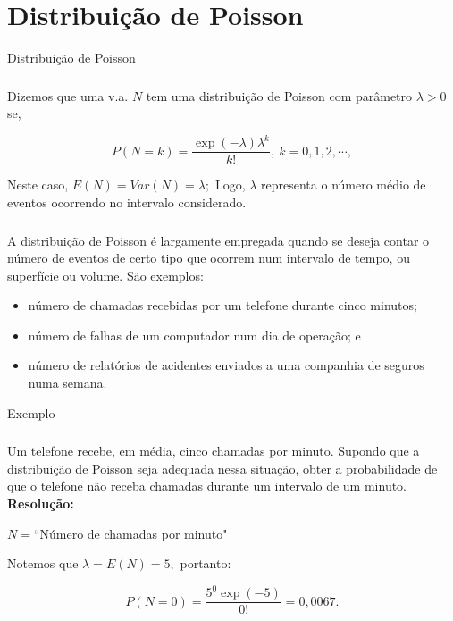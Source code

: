 \documentclass[14pt,aspectratio=1610]{beamer}
\begin{document}
\section{Distribuição de Poisson}
\begin{frame}{Distribuição de Poisson}
\frametitle{}
\begin{block}{}
\justifying
Dizemos que uma v.a. $N$ tem uma distribuição de Poisson com parâmetro
$\lambda > 0$ se,

$$P(N=k)=\dfrac{\exp{(-\lambda)}\lambda^{k}}{k!},\ k=0,1,2,\cdots,$$

Neste caso, $E(N)=Var(N)=\lambda;$ Logo, $\lambda$ representa o número médio de eventos ocorrendo no intervalo considerado.

\end{block}
\end{frame}

\begin{frame}{}
\frametitle{}
\begin{block}{}
\justifying
A distribuição de Poisson é largamente empregada quando se deseja contar o número
de eventos de certo tipo que ocorrem num intervalo de tempo, ou superfície ou 
volume. São exemplos:
\begin{itemize}
\item número de chamadas recebidas por um telefone durante cinco minutos;
\item número de falhas de um computador num dia de operação; e
\item número de relatórios de acidentes enviados a uma companhia de seguros numa
semana.
\end{itemize}
\end{block}
\end{frame}

\begin{frame}{Exemplo}
\frametitle{}
\begin{block}{}
\justifying
Um telefone recebe, em média, cinco chamadas por minuto. Supondo que a distribuição de Poisson seja adequada nessa situação, obter a probabilidade de que o telefone não receba chamadas durante um intervalo de um minuto.
\pause
{\bf Resolução:}

$N=$``Número de chamadas por minuto"

Notemos que $\lambda=E(N)=5,$ portanto:

$$P(N=0)=\dfrac{5^{0}\exp{(-5)}}{0!}=0,0067.$$

\end{block}
\end{frame}
\end{document}
